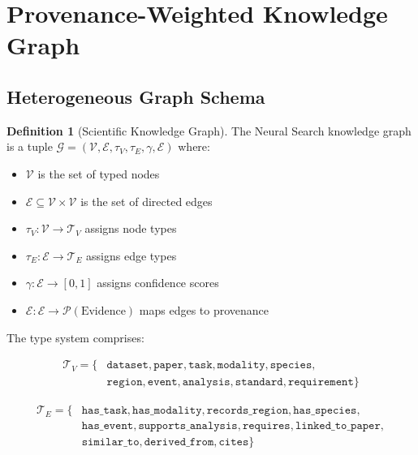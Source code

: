\documentclass{article}
\theoremstyle{definition}
\newtheorem{definition}{Definition}[section]
\newcommand{\graph}{\mathcal{G}}
\newcommand{\nodes}{\mathcal{V}}
\newcommand{\edges}{\mathcal{E}}
\newcommand{\confidence}{\gamma}
\newcommand{\evidence}{\mathcal{E}}
\begin{document}
\section{Provenance-Weighted Knowledge Graph}
\label{sec:graph}

\subsection{Heterogeneous Graph Schema}

\begin{definition}[Scientific Knowledge Graph]
\label{def:kg}
The Neural Search knowledge graph is a tuple $\graph = (\nodes, \edges, \tau_V, \tau_E, \confidence, \evidence)$ where:
\begin{itemize}
    \item $\nodes$ is the set of typed nodes
    \item $\edges \subseteq \nodes \times \nodes$ is the set of directed edges
    \item $\tau_V: \nodes \rightarrow \mathcal{T}_V$ assigns node types
    \item $\tau_E: \edges \rightarrow \mathcal{T}_E$ assigns edge types
    \item $\confidence: \edges \rightarrow [0, 1]$ assigns confidence scores
    \item $\evidence: \edges \rightarrow \mathcal{P}(\text{Evidence})$ maps edges to provenance
\end{itemize}
\end{definition}

The type system comprises:

\begin{align*}
\mathcal{T}_V = \{&\texttt{dataset}, \texttt{paper}, \texttt{task}, \texttt{modality}, \texttt{species}, \\
&\texttt{region}, \texttt{event}, \texttt{analysis}, \texttt{standard}, \texttt{requirement}\}
\end{align*}

\begin{align*}
\mathcal{T}_E = \{&\texttt{has\_task}, \texttt{has\_modality}, \texttt{records\_region}, \texttt{has\_species}, \\
&\texttt{has\_event}, \texttt{supports\_analysis}, \texttt{requires}, \texttt{linked\_to\_paper}, \\
&\texttt{similar\_to}, \texttt{derived\_from}, \texttt{cites}\}
\end{align*}
\end{document}
